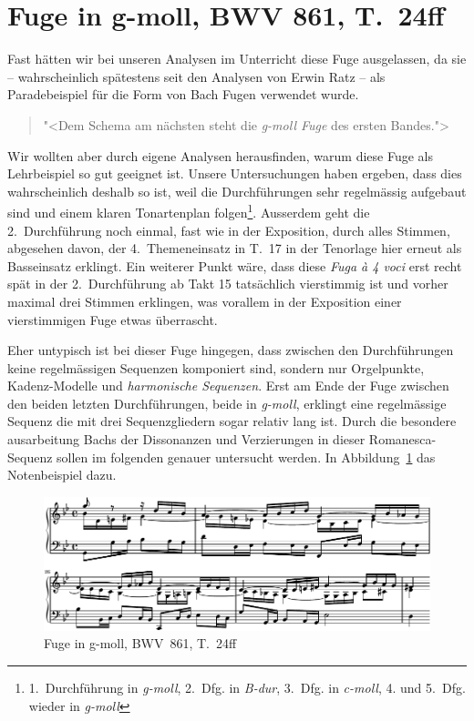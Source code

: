 \section{Fuge in g-moll, BWV 861, T.~24ff}

Fast hätten wir bei unseren Analysen im Unterricht diese Fuge ausgelassen, da sie -- wahrscheinlich spätestens seit den Analysen von Erwin Ratz -- als Paradebeispiel für die Form von Bach Fugen verwendet wurde.

\begin{quote}
"<Dem Schema am nächsten steht die \emph{g-moll Fuge} des ersten Bandes.">\autocite[80f]{ratz:formenlehre}
\end{quote}

Wir wollten aber durch eigene Analysen herausfinden, warum diese Fuge als Lehrbeispiel so gut geeignet ist.
Unsere Untersuchungen haben ergeben, dass dies wahrscheinlich deshalb so ist, weil die Durchführungen sehr regelmässig aufgebaut sind und einem klaren Tonartenplan folgen\footnote{1.~Durchführung in \emph{g-moll}, 2.~Dfg. in \emph{B-dur}, 3.~Dfg. in \emph{c-moll}, 4. und 5.~Dfg. wieder in \emph{g-moll}}.
Ausserdem geht die 2.~Durchführung noch einmal, fast wie in der Exposition, durch alles Stimmen, abgesehen davon, der 4.~Themeneinsatz in T.~17 in der Tenorlage hier erneut als Basseinsatz erklingt.
Ein weiterer Punkt wäre, dass diese \emph{Fuga à 4 voci} erst recht spät in der 2.~Durchführung ab Takt 15 tatsächlich vierstimmig ist und vorher maximal drei Stimmen erklingen, was vorallem in der Exposition einer vierstimmigen Fuge etwas überrascht.

Eher untypisch ist bei dieser Fuge hingegen, dass zwischen den Durchführungen keine regelmässigen Sequenzen komponiert sind, sondern nur Orgelpunkte, Kadenz-Modelle und \emph{harmonische Sequenzen}.
Erst am Ende der Fuge zwischen den beiden letzten Durchführungen, beide in \emph{g-moll}, erklingt eine regelmässige Sequenz die mit drei Sequenzgliedern sogar relativ lang ist.
Durch die besondere ausarbeitung Bachs der Dissonanzen und Verzierungen in dieser Romanesca-Sequenz sollen im folgenden genauer untersucht werden.
In Abbildung~\ref{fig:bwv681-original} das Notenbeispiel dazu.

\begin{figure}[htbp]
	\centering
	\includegraphics{lilypond/g-moll/render/original}
	\caption{Fuge in g-moll, BWV~861, T.~24ff}
	\label{fig:bwv681-original}
\end{figure}

